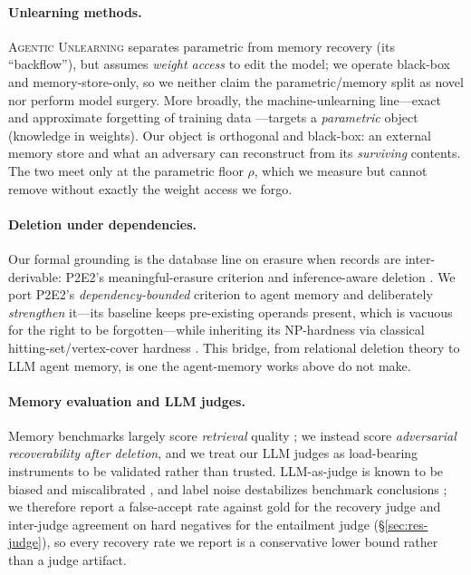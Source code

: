 \documentclass[10pt,twocolumn,letterpaper]{article}
\theoremstyle{definition}
\theoremstyle{plain}
\newcommand{\sys}[1]{\textsc{#1}}
\begin{document}
\paragraph{Unlearning methods.}
\sys{Agentic Unlearning} \citep{agenticunlearning} separates parametric from
memory recovery (its ``backflow''), but assumes \emph{weight access} to edit the
model; we operate black-box and memory-store-only, so we neither claim the
parametric/memory split as novel nor perform model surgery. More broadly, the
machine-unlearning line---exact and approximate forgetting of training data
\citep{cao2015towards,bourtoule2021unlearning,nguyen2022survey}---targets a
\emph{parametric} object (knowledge in weights). Our object is orthogonal and
black-box: an external memory store and what an adversary can reconstruct from its
\emph{surviving} contents. The two meet only at the parametric floor $\rho$, which
we measure but cannot remove without exactly the weight access we forgo.

\paragraph{Deletion under dependencies.}
Our formal grounding is the database line on erasure when records are
inter-derivable: P2E2's meaningful-erasure criterion \citep{p2e2} and
inference-aware deletion \citep{seqdb}. We port P2E2's \emph{dependency-bounded}
criterion to agent memory and deliberately \emph{strengthen} it---its baseline
keeps pre-existing operands present, which is vacuous for the right to be
forgotten---while inheriting its NP-hardness via classical hitting-set/vertex-cover
hardness \citep{karp1972reducibility,garey1979computers}. This bridge, from
relational deletion theory to LLM agent memory, is one the agent-memory works
above do not make.

\paragraph{Memory evaluation and LLM judges.}
Memory benchmarks largely score \emph{retrieval} quality
\citep{maharana2024locomo,wu2025longmemeval}; we instead score \emph{adversarial
recoverability after deletion}, and we treat our LLM judges as load-bearing
instruments to be validated rather than trusted. LLM-as-judge is known to be
biased and miscalibrated \citep{zheng2023judge,sharma2024sycophancy}, and label
noise destabilizes benchmark conclusions \citep{northcutt2021labelerrors}; we
therefore report a false-accept rate against gold for the recovery judge and
inter-judge agreement on hard negatives for the entailment judge
(\S\ref{sec:res-judge}), so every recovery rate we report is a conservative lower
bound rather than a judge artifact.
\end{document}
